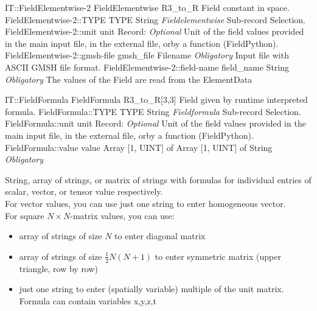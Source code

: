 \begin{RecordType}
	{IT::FieldElementwise-2}
	{FieldElementwise}
	{} %
	{} %
	{{{R3{\_}to{\_}R Field constant in space.}}}
		\RecKey
			{FieldElementwise-2::TYPE}
			{TYPE}
			{{String}}
			{ \it{Fieldelementwise} }
			{{{Sub-record Selection.}}}
		\RecKey
			{FieldElementwise-2::unit}
			{unit}
			{{Record}{: }}
			{ \it{Optional} }
			{{{Unit of the field values provided in the main input file, in the external file, orby a function (FieldPython).}}}
		\RecKey
			{FieldElementwise-2::gmsh-file}
			{gmsh{\_}file}
			{{Filename}}
			{ \it{Obligatory} }
			{{{Input file with ASCII GMSH file format.}}}
		\RecKey
			{FieldElementwise-2::field-name}
			{field{\_}name}
			{{String}}
			{ \it{Obligatory} }
			{{{The values of the Field are read from the }\ttfamily {\$}ElementData}}
\end{RecordType}
\begin{RecordType}
	{IT::FieldFormula}
	{FieldFormula}
	{} %
	{} %
	{{{R3{\_}to{\_}R[3,3] Field given by runtime interpreted formula.}}}
		\RecKey
			{FieldFormula::TYPE}
			{TYPE}
			{{String}}
			{ \it{Fieldformula} }
			{{{Sub-record Selection.}}}
		\RecKey
			{FieldFormula::unit}
			{unit}
			{{Record}{: }}
			{ \it{Optional} }
			{{{Unit of the field values provided in the main input file, in the external file, orby a function (FieldPython).}}}
		\RecKey
			{FieldFormula::value}
			{value}
			{{Array [1, UINT] of }{Array [1, UINT] of }{String}}
			{ \it{Obligatory} }
			{{{{String, array of strings, or matrix of strings with formulas for individual entries of scalar, vector, or tensor value respectively.}\\{
For vector values, you can use just one string to enter homogeneous vector.}\\{
For square }{$N\times N$}{-matrix values, you can use:}
}
\begin{itemize}
\item {array of strings of size }{$N$}{ to enter diagonal matrix}
\item {array of strings of size }{$\frac12N(N+1)$}{ to enter symmetric matrix (upper triangle, row by row)}
\item {just one string to enter (spatially variable) multiple of the unit matrix.}\\{
Formula can contain variables }\ttfamily x,y,z,t
\end{itemize}
}}
\end{RecordType}
